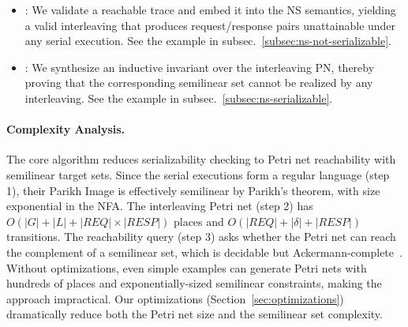 \begin{enumerate}
	\begin{itemize}
		
		\item[\sat]: We validate a reachable trace and embed it into the NS semantics, yielding a valid interleaving that produces request/response pairs unattainable under any serial execution.
		See the example in subsec.~\ref{subsec:ns-not-serializable}.
		
		\item[\unsat]: We synthesize an inductive invariant over the interleaving PN, thereby proving that the corresponding semilinear set cannot be realized by any interleaving.
		See the example in subsec.~\ref{subsec:ns-serializable}.
		
		
	
\end{itemize}

\end{enumerate}

\paragraph{Complexity Analysis.}
The core algorithm reduces serializability checking to Petri net reachability with semilinear target sets. 
Since the serial executions form a regular language (step 1), their Parikh Image is effectively semilinear by Parikh's theorem, with size exponential in the NFA.
The interleaving Petri net (step 2) has $O(|G| + |L| + |\mathit{REQ}| \times |\mathit{RESP}|)$ places and $O(|\mathit{REQ}| + |\delta| + |\mathit{RESP}|)$ transitions.
The reachability query (step 3) asks whether the Petri net can reach the complement of a semilinear set, which is decidable but Ackermann-complete~\cite{CzWo22}.
Without optimizations, even simple examples can generate Petri nets with hundreds of places and exponentially-sized semilinear constraints, making the approach impractical.
Our optimizations (Section~\ref{sec:optimizations}) dramatically reduce both the Petri net size and the semilinear set complexity.


